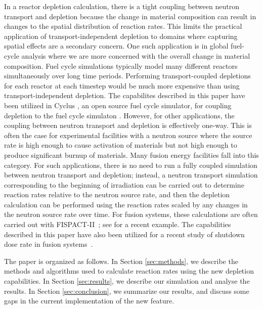     In a reactor depletion calculation, there is a tight coupling between
    neutron transport and depletion because the change in material composition
    can result in changes to the spatial distribution of reaction rates. This
    limits the practical application of transport-independent depletion to
    domains where capturing spatial effects are a secondary concern. One
    such application is in global fuel-cycle analysis where we are more
    concerned with the overall change in material composition. Fuel cycle
    simulations typically model many different reactors simultaneously over
    long time periods. Performing transport-coupled depletions for each reactor
    at each timestep would be much more expensive than using
    transport-independent depletion. The capabilites described in this paper
    have been utilized in Cyclus \cite{huff_fundamental_2016}, an open source
    fuel cycle simulator, for coupling depletion to the fuel cycle
    simulaton \cite{bachmann_os_2024}. However, for other applications, the
    coupling between neutron transport and depletion is effectively one-way.
    This is often the case for experimental facilities with a neutron source
    where the source rate is high enough to cause activation of materials but
    not high enough to produce significant burnup of materials. Many fusion
    energy facilities fall into this category.  For such applications, there is
    no need to run a fully coupled simulation between neutron transport and
    depletion; instead, a neutron transport simulation corresponding to the
    beginning of irradiation can be carried out to determine reaction rates
    relative to the neutron source rate, and then the depletion calculation can
    be performed using the reaction rates scaled by any changes in the neutron
    source rate over time. For fusion systems, these calculations are often
    carried out with FISPACT-II~\citep{sublet2017nds}; see \citet{eade2020nf}
    for a recent example. The capabilities described in this paper have also
    been utilized for a recent study of shutdown dose rate in fusion
    systems~\citep{peterson2024nf}.

    The paper is organized as follows. In Section \ref{sec:methods}, we describe
    the methods and algorithms used to calculate reaction rates using the new
    depletion capabilities. In Section \ref{sec:results}, we describe our
    simulation and analyse the results. In Section \ref{sec:conclusion}, we
    summarize our results, and discuss some gaps in the current implementation
    of the new feature.


